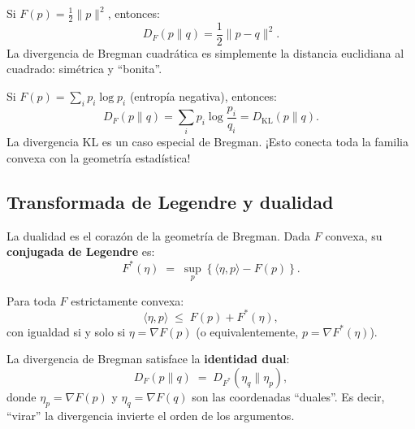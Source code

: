 \begin{example}[Cuadrática]
	Si $F(p) = \frac{1}{2}\|p\|^2$, entonces:
	\[
	D_F(p \| q) = \frac{1}{2}\|p - q\|^2.
	\]
	La divergencia de Bregman cuadrática es simplemente la distancia euclidiana al cuadrado: simétrica y ``bonita''.
\end{example}

\begin{example}
	Si $F(p) = \sum_i p_i \log p_i$ (entropía negativa), entonces:
	\[
	D_F(p \| q) = \sum_i p_i \log \frac{p_i}{q_i} = D_{\mathrm{KL}}(p \| q).
	\]
	La divergencia KL es un caso especial de Bregman.  ¡Esto conecta toda la familia convexa con la geometría estadística!
\end{example}

\subsection{Transformada de Legendre y dualidad}

La dualidad es el corazón de la geometría de Bregman.  Dada $F$ convexa, su \textbf{conjugada de Legendre} es:
\[
F^*(\eta) \;=\; \sup_p \left\{ \langle \eta, p \rangle - F(p) \right\}.
\]

\begin{theorem}
	Para toda $F$ estrictamente convexa:
	\[
	\langle \eta, p \rangle \;\le\; F(p) + F^*(\eta),
	\]
	con igualdad si y solo si $\eta = \nabla F(p)$ (o equivalentemente, $p = \nabla F^*(\eta)$).
\end{theorem}

\begin{theorem}
	La divergencia de Bregman satisface la \textbf{identidad dual}:
	\[
	D_F(p \| q) \;=\; D_{F^*}(\eta_q \| \eta_p),
	\]
	donde $\eta_p = \nabla F(p)$ y $\eta_q = \nabla F(q)$ son las coordenadas ``duales''.  Es decir, ``virar'' la divergencia invierte el orden de los argumentos.
\end{theorem}

\begin{center}
\end{center}

